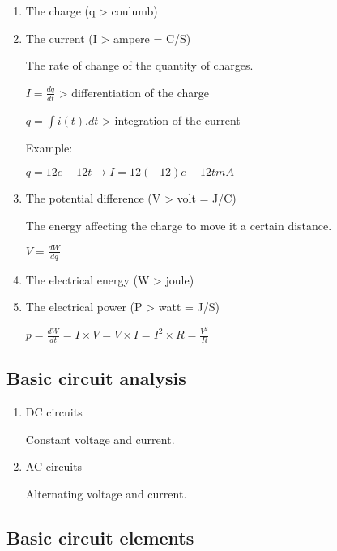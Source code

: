\documentclass[11pt]{article}
\begin{document}
\begin{enumerate}
\item The charge  (q > coulumb)

\item The current (I > ampere = C/S)

The rate of change of the quantity of charges.

\(I = \tfrac{dq}{dt}\)   > differentiation of the charge

\(q = \int i(t).dt\) > integration of the current

Example:

\(q = 12e-12t \rightarrow I = 12(-12)e-12t mA\)

\item The potential difference (V > volt = J/C)

The energy affecting the charge to move it a certain distance.

\(V = \frac{dW}{dq}\)

\item The electrical energy (W > joule)

\item The electrical power (P > watt = J/S)

\(p = \frac{dW}{dt} = I \times V = V \times I = I^{2} \times R = \frac{V^{2}}{R}\)
\end{enumerate}
\subsection{Basic circuit analysis}
\label{sec:orgb8ed15e}

\begin{enumerate}
\item DC circuits

Constant voltage and current.

\item AC circuits

Alternating voltage and current.
\end{enumerate}
\subsection{Basic circuit elements}
\label{sec:org6d0a1cf}
\end{document}
